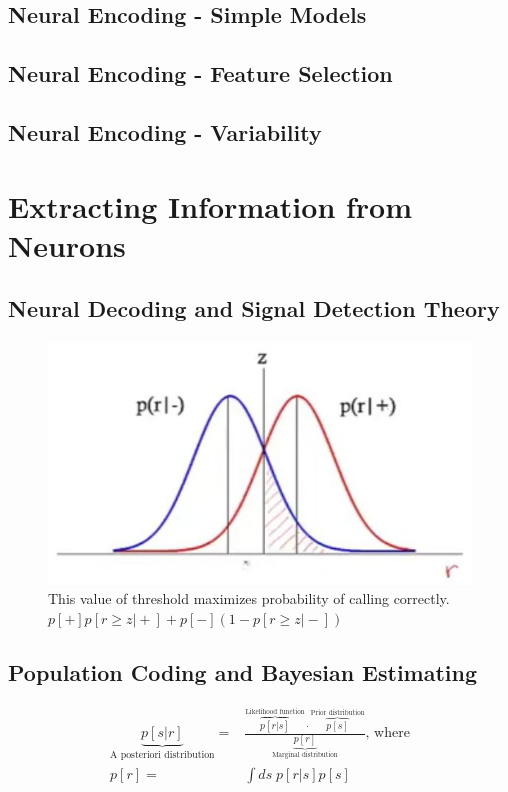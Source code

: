 \documentclass[]{article}
\begin{document}
\subsection{Neural Encoding - Simple Models}
\subsection{Neural Encoding - Feature Selection}
\subsection{Neural Encoding - Variability}
\section{Extracting Information from Neurons}\label{sec:week3}

\subsection{Neural Decoding and Signal Detection Theory}

\begin{figure}[H]
		\caption[Value of threshold that maximizes probability of correct call]{This value of threshold maximizes probability of calling correctly.
			$p[+]p[r\ge z\vert +] + p[-] (1-p[r\ge z\vert -])$}
		\includegraphics[width=\textwidth]{signal-detection1}
\end{figure}
\subsection{Population Coding and Bayesian Estimating}

\begin{align*}
	\underbrace{p[s\vert r]}_\text{A posteriori distribution} =& \frac{\overbrace{p[r\vert s]}^\text{Likelihood function} \cdot \overbrace{p[s]}^\text{Prior distribution}}{\underbrace{p[r]}_\text{Marginal distribution}} \text{, where}\\
	p[r] =& \int ds \; p[r\vert s] p[s]
\end{align*}
\end{document}
